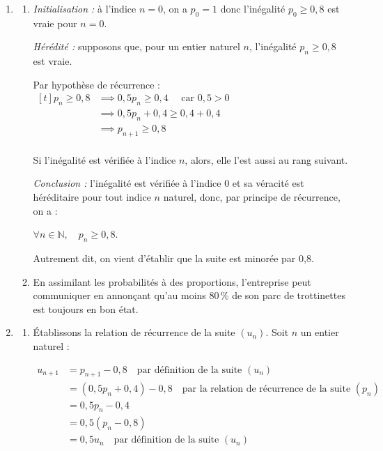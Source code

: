 \documentclass[10pt]{article}
\providecommand{\N}{\mathbb{N}}
\begin{document}
\begin{enumerate}
$p_{n+1} = P(B_{n+1}) = P\Big(B_n \cap B_{n+1}\Big) + P\Big(\overline{B_n} \cap B_{n+1} \Big) = p_n \times 0,9 + (1-p_n) \times 0,4 = 0,9p_n + 0,4 - 0,4p_n $

Donc on a bien $p_{n+1} = 0,5p_n + 0,4$ : on a donc bien établi la relation de récurrence annoncée.

\item 
	\begin{enumerate}
		\item \emph{Initialisation :} à l'indice $n=0$, on a $p_0 = 1$ donc l'inégalité $p_0 \geqslant 0,8$ est vraie pour $n = 0$.

\emph{Hérédité :} supposons que, pour un entier naturel $n$, l'inégalité $p_n \geqslant 0,8$ est vraie.

Par hypothèse de récurrence : $\begin{aligned}[t] p_n \geqslant 0,8 &\implies 0,5p_n \geqslant 0,4 \quad \text{ car } 0,5 > 0\\
				&\implies 0,5p_n + 0,4 \geqslant 0,4 + 0,4\\
				&\implies p_{n+1} \geqslant 0,8\\ \end{aligned}$

Si l'inégalité est vérifiée à l'indice $n$, alors, elle l'est aussi au rang suivant.


\emph{Conclusion :} l'inégalité est vérifiée à l'indice 0 et sa véracité est héréditaire pour tout indice $n$ naturel, donc, par principe de récurrence, on a :

$\forall n \in \N, \quad p_n \geqslant 0,8$.

Autrement dit, on vient d'établir que la suite est minorée par 0,8.

		\item En assimilant les probabilités à des proportions, l'entreprise peut communiquer en annonçant qu'au moins 80\,\% de son parc de trottinettes est toujours en bon état.
\end{enumerate}
\item 
		\begin{enumerate}
			\item Établissons la relation de récurrence de la suite $\left(u_n\right)$. Soit $n$ un entier naturel :

$\begin{aligned} u_{n+1} &= p_{n+1} - 0,8 \quad \text{par définition de la suite } (u_n)\\
&= (0,5p_n + 0,4) - 0,8 \quad \text{par la relation de récurrence de la suite } (p_n)\\
&= 0,5p_n - 0,4\\
&= 0,5(p_n - 0,8)\\
&= 0,5u_n \quad \text{par définition de la suite } \left(u_n\right)\\ \end{aligned}$


\end{enumerate}
\end{enumerate}
\end{document}
